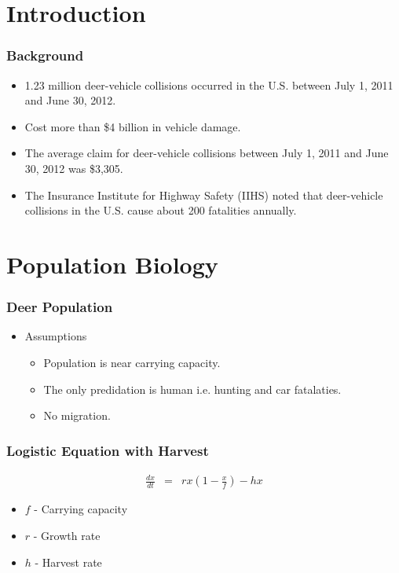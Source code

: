 
\section{Introduction}

\begin{frame}
    \frametitle{Background}
    \begin{itemize}
    	\item 1.23 million deer-vehicle collisions occurred in the U.S. between July 1, 2011 and June 30, 2012.
    	\item Cost more than \$4 billion in vehicle damage.
    	\item The average claim for deer-vehicle collisions between July 1, 2011 and June 30, 2012 was \$3,305.
    	\item The Insurance Institute for Highway Safety (IIHS) noted that deer-vehicle collisions in the U.S. cause about 200 fatalities annually.
    \end{itemize}
\end{frame}




\section{Population Biology}

\begin{frame}
    \frametitle{Deer Population}
    \begin{itemize}
    	\item Assumptions
		\begin{itemize}
    		\item Population is near carrying capacity.
    		\item The only predidation is human i.e. hunting and car fatalaties.
    		\item No migration.
    		\end{itemize}
    \end{itemize}
\end{frame}

\begin{frame}
    \frametitle{Logistic Equation with Harvest}
	\vspace{-1cm}
	\begin{eqnarray*}
		\frac{dx}{dt} &=& rx \left( 1-\frac{x}{f} \right) -hx
	\end{eqnarray*}
	\begin{itemize}
		\item $f$ - Carrying capacity
		\item $r$ - Growth rate
		\item $h$ - Harvest rate
	\end{itemize}
\end{frame}

